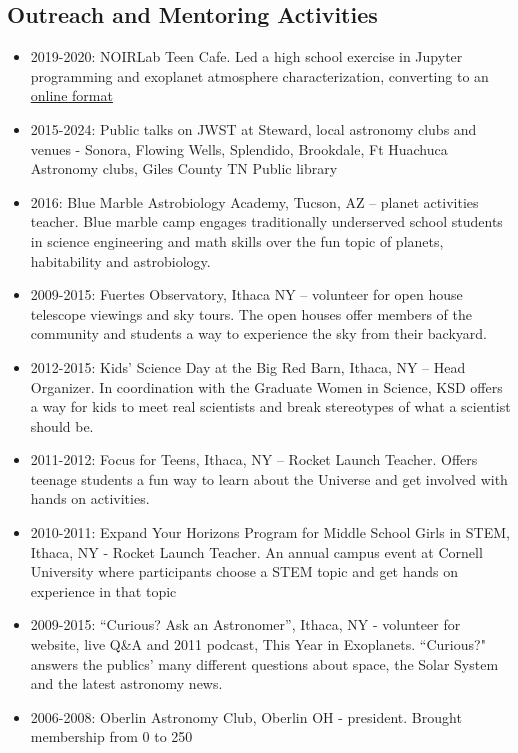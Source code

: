 \documentclass[11pt, oneside]{article}   	%
\begin{document}
\subsection*{Outreach and Mentoring Activities}

\begin{itemize}[noitemsep]
    \item 2019-2020: NOIRLab Teen Cafe. Led a high school exercise in Jupyter programming and exoplanet atmosphere characterization, converting to an \href{https://eas342.github.io/interactive_lc/exoplanet_spectra_cafe.html}{online format}
    \item 2015-2024: Public talks on JWST at Steward, local astronomy clubs and venues - Sonora, Flowing Wells, Splendido, Brookdale, Ft Huachuca Astronomy clubs, Giles County TN Public library
    \item 2016: Blue Marble Astrobiology Academy, Tucson, AZ -- planet activities teacher. Blue marble camp engages traditionally underserved school students in science engineering and math skills over the fun topic of planets, habitability and astrobiology.
    \item 2009-2015: Fuertes Observatory, Ithaca NY -- volunteer for open house telescope viewings and sky tours. The open houses offer members of the community and students a way to experience the sky from their backyard.
    \item 2012-2015: Kids' Science Day at the Big Red Barn, Ithaca, NY -- Head Organizer. In coordination with the Graduate Women in Science, KSD offers a way for kids to meet real scientists and break stereotypes of what a scientist should be.
    \item 2011-2012: Focus for Teens, Ithaca, NY -- Rocket Launch Teacher. Offers teenage students a fun way to learn about the Universe and get involved with hands on activities.
    \item 2010-2011: Expand Your Horizons Program for Middle School Girls in STEM, Ithaca, NY - Rocket Launch Teacher. An annual campus event at Cornell University where participants choose a STEM topic and get hands on experience in that topic
    \item 2009-2015: ``Curious? Ask an Astronomer'', Ithaca, NY - volunteer for website, live Q\&A and 2011 podcast, This Year in Exoplanets. ``Curious?" answers the publics' many different questions about space, the Solar System and the latest astronomy news.
    \item 2006-2008: Oberlin Astronomy Club, Oberlin OH - president. Brought membership from 0 to 250
 \end{itemize}
\end{document}
